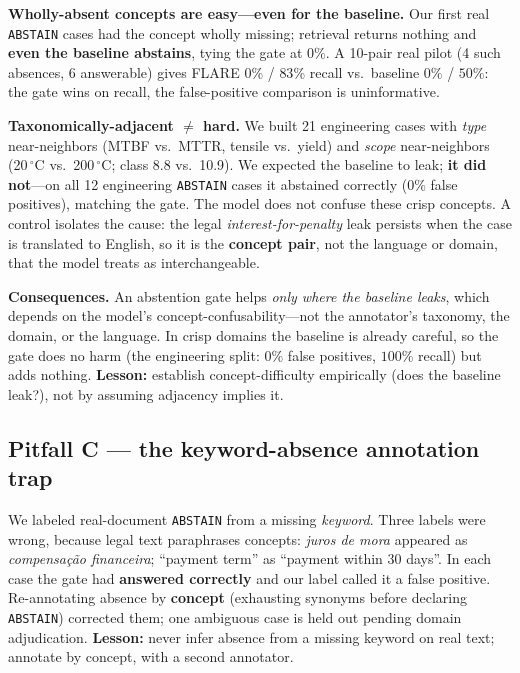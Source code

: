 \documentclass[11pt]{article}
\begin{document}
\textbf{Wholly-absent concepts are easy---even for the baseline.} Our first real
\texttt{ABSTAIN} cases had the concept wholly missing; retrieval returns nothing
and \textbf{even the baseline abstains}, tying the gate at $0\%$. A 10-pair real
pilot (4 such absences, 6 answerable) gives FLARE $0\%$ / $83\%$ recall vs.\
baseline $0\%$ / $50\%$: the gate wins on recall, the false-positive comparison is
uninformative.

\textbf{Taxonomically-adjacent $\neq$ hard.} We built 21 engineering cases with
\emph{type} near-neighbors (MTBF vs.\ MTTR, tensile vs.\ yield) and \emph{scope}
near-neighbors (20\,$^\circ$C vs.\ 200\,$^\circ$C; class 8.8 vs.\ 10.9). We
expected the baseline to leak; \textbf{it did not}---on all 12 engineering
\texttt{ABSTAIN} cases it abstained correctly ($0\%$ false positives), matching
the gate. The model does not confuse these crisp concepts. A control isolates the
cause: the legal \emph{interest-for-penalty} leak persists when the case is
translated to English, so it is the \textbf{concept pair}, not the language or
domain, that the model treats as interchangeable.

\textbf{Consequences.} An abstention gate helps \emph{only where the baseline
leaks}, which depends on the model's concept-confusability---not the annotator's
taxonomy, the domain, or the language. In crisp domains the baseline is already
careful, so the gate does no harm (the engineering split: $0\%$ false positives,
$100\%$ recall) but adds nothing. \textbf{Lesson:} establish concept-difficulty
empirically (does the baseline leak?), not by assuming adjacency implies it.

\subsection{Pitfall C --- the keyword-absence annotation trap}
\label{sec:pc}
We labeled real-document \texttt{ABSTAIN} from a missing \emph{keyword}. Three
labels were wrong, because legal text paraphrases concepts: \emph{juros de mora}
appeared as \emph{compensação financeira}; ``payment term'' as ``payment within
30 days''. In each case the gate had \textbf{answered correctly} and our label
called it a false positive. Re-annotating absence by \textbf{concept} (exhausting
synonyms before declaring \texttt{ABSTAIN}) corrected them; one ambiguous case is
held out pending domain adjudication. \textbf{Lesson:} never infer absence from a
missing keyword on real text; annotate by concept, with a second annotator.
\end{document}
